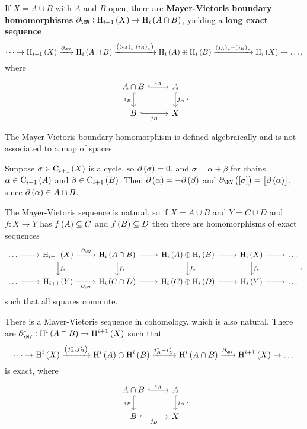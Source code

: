 \begin{theorem}
If $ X = A \cup B $ with $ A $ and $ B $ open, there are \textbf{Mayer-Vietoris boundary homomorphisms} $ \da_{\MV} : \H_{i + 1}\br{X} \to \H_i\br{A \cap B} $, yielding a \textbf{long exact sequence}
$$ \dots \to \H_{i + 1}\br{X} \xrightarrow{\da_{\MV}} \H_i\br{A \cap B} \xrightarrow{\br{\br{i_A}_*, \br{i_B}_*}} \H_i\br{A} \oplus \H_i\br{B} \xrightarrow{\br{j_A}_* - \br{j_B}_*} \H_i\br{X} \to \dots, $$
where
$$
\begin{tikzcd}
A \cap B \arrow[hookrightarrow]{r}{i_A} \arrow[hookrightarrow]{d}[swap]{i_B} & A \arrow[hookrightarrow]{d}{j_A} \\
B \arrow[hookrightarrow]{r}[swap]{j_B} & X
\end{tikzcd}.
$$
\end{theorem}

The Mayer-Vietoris boundary homomorphism is defined algebraically and is not associated to a map of spaces.

\begin{remark*}
Suppose $ \sigma \in \C_{i + 1}\br{X} $ is a cycle, so $ \da\br{\sigma} = 0 $, and $ \sigma = \alpha + \beta $ for chains $ \alpha \in \C_{i + 1}\br{A} $ and $ \beta \in \C_{i + 1}\br{B} $. Then $ \da\br{\alpha} = -\da\br{\beta} $ and $ \da_{\MV}\br{\sbr{\sigma}} = \sbr{\da\br{\alpha}} $, since $ \da\br{\alpha} \in A \cap B $.
\end{remark*}

\begin{remark*}
The Mayer-Vietoris sequence is natural, so if $ X = A \cup B $ and $ Y = C \cup D $ and $ f : X \to Y $ has $ f\br{A} \subseteq C $ and $ f\br{B} \subseteq D $ then there are homomorphisms of exact sequences
$$
\begin{tikzcd}
\dots \arrow{r} & \H_{i + 1}\br{X} \arrow{r}{\da_{\MV}} \arrow{d}{f_*} & \H_i\br{A \cap B} \arrow{r} \arrow{d}{f_*} & \H_i\br{A} \oplus \H_i\br{B} \arrow{r} \arrow{d}{f_*} & \H_i\br{X} \arrow{r} \arrow{d}{f_*} & \dots \\
\dots \arrow{r} & \H_{i + 1}\br{Y} \arrow{r}[swap]{\da_{\MV}} & \H_i\br{C \cap D} \arrow{r} & \H_i\br{C} \oplus \H_i\br{D} \arrow{r} & \H_i\br{Y} \arrow{r} & \dots
\end{tikzcd},
$$
such that all squares commute.
\end{remark*}

\begin{remark*}
There is a Mayer-Vietoris sequence in cohomology, which is also natural. There are $ \da_{\MV}^* : \H^i\br{A \cap B} \to \H^{i + 1}\br{X} $ such that
$$ \dots \to \H^i\br{X} \xrightarrow{\br{j_A^*, j_B^*}} \H^i\br{A} \oplus \H^i\br{B} \xrightarrow{i_A^* - i_B^*} \H^i\br{A \cap B} \xrightarrow{\da_{\MV}} \H^{i + 1}\br{X} \to \dots $$
is exact, where
$$
\begin{tikzcd}
A \cap B \arrow[hookrightarrow]{r}{i_A} \arrow[hookrightarrow]{d}[swap]{i_B} & A \arrow[hookrightarrow]{d}{j_A} \\
B \arrow[hookrightarrow]{r}[swap]{j_B} & X
\end{tikzcd}.
$$
\end{remark*}

